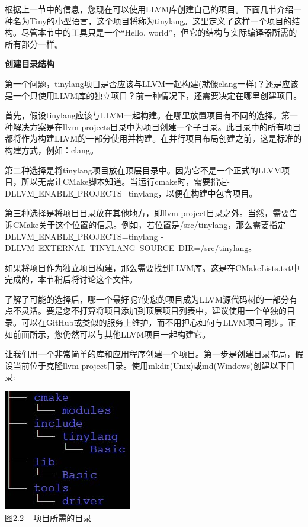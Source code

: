 根据上一节中的信息，您现在可以使用LLVM库创建自己的项目。下面几节介绍一种名为Tiny的小型语言，这个项目将称为tinylang。这里定义了这样一个项目的结构。尽管本节中的工具只是一个“Hello, world”，但它的结构与实际编译器所需的所有部分一样。\par

\hspace*{\fill} \par %
\textbf{创建目录结构}

第一个问题，tinylang项目是否应该与LLVM一起构建(就像clang一样)？还是应该是一个只使用LLVM库的独立项目？前一种情况下，还需要决定在哪里创建项目。\par

首先，假设tinylang应该与LLVM一起构建。在哪里放置项目有不同的选择。第一种解决方案是在llvm-projects目录中为项目创建一个子目录。此目录中的所有项目都将作为构建LLVM的一部分使用并构建。在并行项目布局创建之前，这是标准的构建方式，例如：clang。\par

第二种选择是将tinylang项目放在顶层目录中。因为它不是一个正式的LLVM项目，所以无需让CMake脚本知道。当运行cmake时，需要指定-DLLVM\underline{~}ENABLE\underline{~}PROJECTS=tinylang，以便在构建中包含项目。\par

第三种选择是将项目目录放在其他地方，即llvm-project目录之外。当然，需要告诉CMake关于这个位置的信息。例如，若位置是/src/tinylang，那么需要指定-DLLVM\underline{~}ENABLE\underline{~}PROJECTS=tinylang -DLLVM\underline{~}EXTERNAL\underline{~}TINYLANG\underline{~}SOURCE\underline{~}DIR=/src/tinylang。\par

如果将项目作为独立项目构建，那么需要找到LLVM库。这是在CMakeLists.txt中完成的，本节稍后将讨论这个文件。\par

了解了可能的选择后，哪一个最好呢?使您的项目成为LLVM源代码树的一部分有点不灵活。要是您不打算将项目添加到顶层项目列表中，建议使用一个单独的目录。可以在GitHub或类似的服务上维护，而不用担心如何与LLVM项目同步。正如前面所示，您仍然可以与其他LLVM项目一起构建它。\par

让我们用一个非常简单的库和应用程序创建一个项目。第一步是创建目录布局，假设当前位于克隆llvm-project目录。使用mkdir(Unix)或md(Windows)创建以下目录:\par

\hspace*{\fill} \par %
\begin{center}
\includegraphics{content/1/chapter2/images/2.jpg}\\
图2.2 – 项目所需的目录
\end{center}

